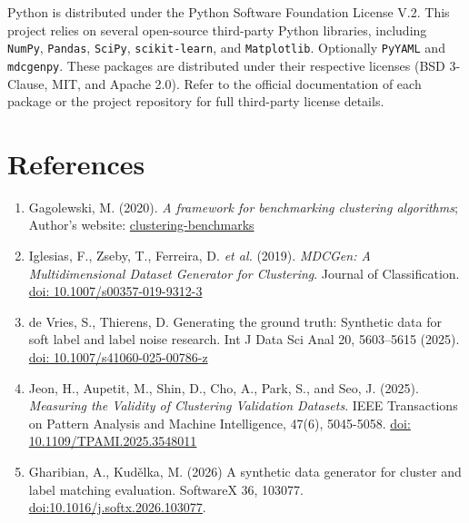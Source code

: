 \documentclass[a4paper,12pt]{article}
\begin{document}
Python is distributed under the Python Software Foundation License V.2. This project relies on several open-source third-party Python libraries, including \texttt{NumPy}, \texttt{Pandas}, \texttt{SciPy}, \texttt{scikit-learn}, and \texttt{Matplotlib}. Optionally \texttt{PyYAML} and \texttt{mdcgenpy}. These packages are distributed under their respective licenses (BSD 3-Clause, MIT, and Apache 2.0). Refer to the official documentation of each package or the project repository for full third-party license details.

\section{References}
\begin{enumerate}
    \item Gagolewski, M. (2020). \textit{A framework for benchmarking clustering algorithms}; Author's website: \href{https://clustering-benchmarks.gagolewski.com/weave/suite-v1.html}{clustering-benchmarks}
    \item Iglesias, F., Zseby, T., Ferreira, D. \textit{et al.} (2019). \textit{MDCGen: A Multidimensional Dataset Generator for Clustering}. Journal of Classification. \href{https://link.springer.com/article/10.1007/s00357-019-9312-3}{doi: 10.1007/s00357-019-9312-3}
    \item de Vries, S., Thierens, D. Generating the ground truth: Synthetic data for soft label and label noise research. Int J Data Sci Anal 20, 5603–5615 (2025). \href{https://doi.org/10.1007/s41060-025-00786-z}{doi: 10.1007/s41060-025-00786-z}
    \item Jeon, H., Aupetit, M., Shin, D., Cho, A., Park, S., and Seo, J. (2025). \textit{Measuring the Validity of Clustering Validation Datasets}. IEEE Transactions on Pattern Analysis and Machine Intelligence, 47(6), 5045-5058. \href{https://doi.org/10.1109/TPAMI.2025.3548011}{doi: 10.1109/TPAMI.2025.3548011}
    \item Gharibian, A., Kudělka, M. (2026) A synthetic data generator for cluster and label matching evaluation. SoftwareX 36, 103077.\\
    \href{https://doi.org/10.1016/j.softx.2026.103077}{doi:10.1016/j.softx.2026.103077}.
\end{enumerate}





\end{document}
